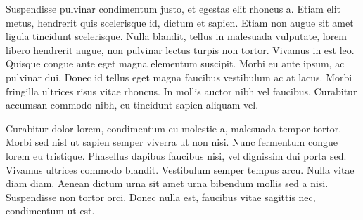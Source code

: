 \documentclass[11pt]{iopart}
\begin{document}
Suspendisse pulvinar condimentum justo, et egestas elit rhoncus a. Etiam elit metus, hendrerit quis scelerisque id, dictum et sapien. Etiam non augue sit amet ligula tincidunt scelerisque. Nulla blandit, tellus in malesuada vulputate, lorem libero hendrerit augue, non pulvinar lectus turpis non tortor. Vivamus in est leo. Quisque congue ante eget magna elementum suscipit. Morbi eu ante ipsum, ac pulvinar dui. Donec id tellus eget magna faucibus vestibulum ac at lacus. Morbi fringilla ultrices risus vitae rhoncus. In mollis auctor nibh vel faucibus. Curabitur accumsan commodo nibh, eu tincidunt sapien aliquam vel.

Curabitur dolor lorem, condimentum eu molestie a, malesuada tempor tortor. Morbi sed nisl ut sapien semper viverra ut non nisi. Nunc fermentum congue lorem eu tristique. Phasellus dapibus faucibus nisi, vel dignissim dui porta sed. Vivamus ultrices commodo blandit. Vestibulum semper tempus arcu. Nulla vitae diam diam. Aenean dictum urna sit amet urna bibendum mollis sed a nisi. Suspendisse non tortor orci. Donec nulla est, faucibus vitae sagittis nec, condimentum ut est.
\end{document}

